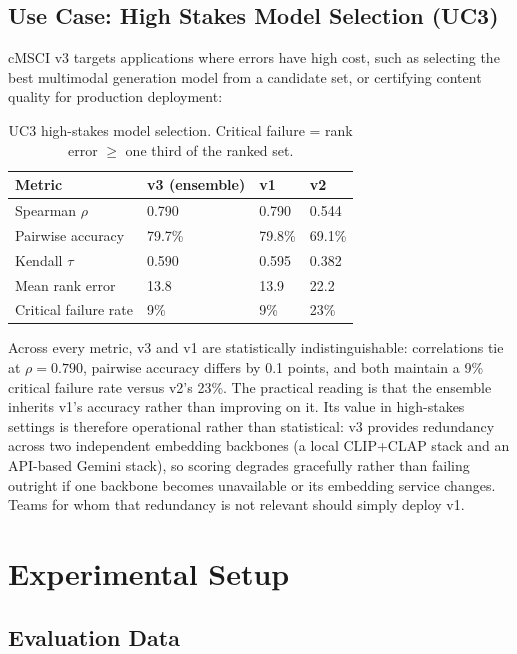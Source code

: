 \documentclass[a4paper,fleqn]{cas-sc}
\begin{document}
\begin{itemize}
\subsection{Use Case: High Stakes Model Selection (UC3)}\label{sec:uc3}

cMSCI v3 targets applications where errors have high cost, such as selecting the best multimodal generation model from a candidate set, or certifying content quality for production deployment:

\begin{table}[t]
\caption{UC3 high-stakes model selection. Critical failure = rank error $\geq$ one third of the ranked set.}\label{tab:uc3}
\centering
\begin{tabular}{llll}
\toprule
Metric & v3 (ensemble) & v1 & v2 \\
\midrule
Spearman $\rho$ & 0.790 & 0.790 & 0.544 \\
Pairwise accuracy & 79.7\% & 79.8\% & 69.1\% \\
Kendall $\tau$ & 0.590 & 0.595 & 0.382 \\
Mean rank error & 13.8 & 13.9 & 22.2 \\
Critical failure rate & 9\% & 9\% & 23\% \\
\bottomrule
\end{tabular}
\end{table}

Across every metric, v3 and v1 are statistically indistinguishable: correlations tie at $\rho = 0.790$, pairwise accuracy differs by 0.1 points, and both maintain a 9\% critical failure rate versus v2's 23\%. The practical reading is that the ensemble inherits v1's accuracy rather than improving on it. Its value in high-stakes settings is therefore operational rather than statistical: v3 provides redundancy across two independent embedding backbones (a local CLIP+CLAP stack and an API-based Gemini stack), so scoring degrades gracefully rather than failing outright if one backbone becomes unavailable or its embedding service changes. Teams for whom that redundancy is not relevant should simply deploy v1.

\section{Experimental Setup}\label{sec:experimental-setup}

\subsection{Evaluation Data}\label{sec:eval-data}


\end{itemize}
\end{document}
